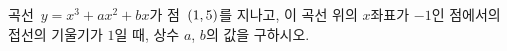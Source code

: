 곡선~$y=x^3+ax^2+bx$가 점~$(1{,}\mkern3mu\mathopen{}5)$를 지나고, 이 곡선 위의 $x$좌표가 $-1$인 점에서의 접선의 기울기가 $1$일 때, 상수 $a$, $b$의 값을 구하시오.
